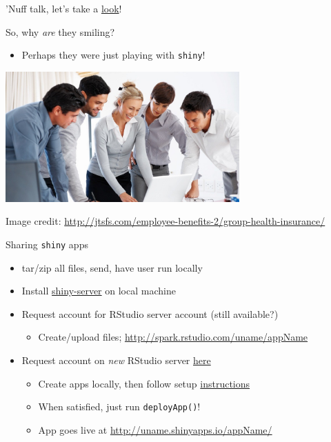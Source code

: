 \documentclass[sans,aspectratio=169,presentation,bigger,fleqn]{beamer}
\begin{document}
\begin{frame}[label=sec-21]{}
\vfill
\begin{center}
'Nuff talk, let's take a \href{http://spark.rstudio.com/jwhendy/insurance-visualizer}{look}!
\end{center}
\vfill
\end{frame}
\begin{frame}[fragile,label=sec-22]{So, why \emph{are} they smiling?}
 \begin{itemize}
\item Perhaps they were just playing with \texttt{shiny}!
\end{itemize}

\begin{center}
\includegraphics[height=5cm]{./img/choosing-insurance.jpg}
\end{center}

\vspace{-0.5cm}

\tiny
Image credit: \url{http://jtsfs.com/employee-benefits-2/group-health-insurance/}
\end{frame}
\begin{frame}[fragile,label=sec-23]{Sharing \texttt{shiny} apps}
 \begin{itemize}
\item tar/zip all files, send, have user run locally
\item Install \href{http://www.rstudio.com/shiny/server/}{shiny-server} on local machine

\item Request account for RStudio server account (still available?)
\begin{itemize}
\item Create/upload files; \url{http://spark.rstudio.com/uname/appName}
\end{itemize}

\item Request account on \emph{new} RStudio server \href{http://www.shinyapps.io/signup.html}{here}
\begin{itemize}
\item Create apps locally, then follow setup \href{https://github.com/rstudio/shinyapps/blob/master/guide/guide.md}{instructions}
\item When satisfied, just run \texttt{deployApp()}!
\item App goes live at \url{http://uname.shinyapps.io/appName/}
\end{itemize}
\end{itemize}
\end{frame}
\end{document}
